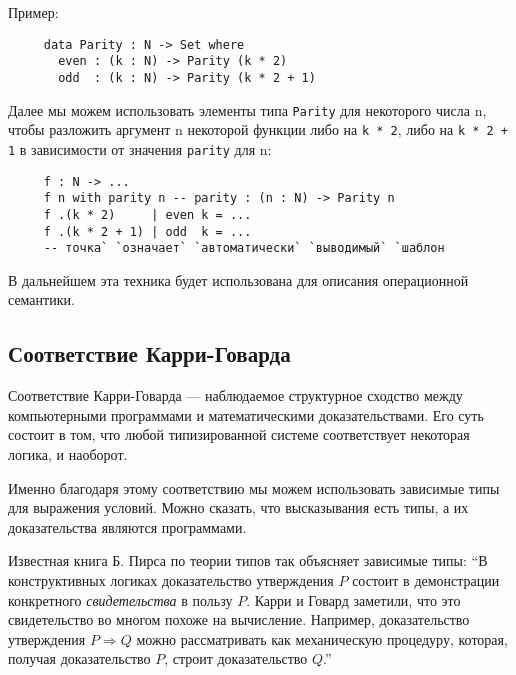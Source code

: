 \documentclass[aps,12pt,final,oneside,onecolumn,musixtex,superscriptaddress,centertags]{article}
\newcommand{\lcode}[1]{\lstinline[basicstyle=\ttfamily\normalsize]{#1}}
\begin{document}
     Пример:
     \begin{lstlisting}
     data Parity : N -> Set where
       even : (k : N) -> Parity (k * 2)
       odd  : (k : N) -> Parity (k * 2 + 1)
     \end{lstlisting}

     Далее мы можем использовать элементы типа \lcode{Parity} для некоторого числа n, чтобы разложить аргумент n некоторой функции либо на \lcode{k * 2}, либо на \lcode{k * 2 + 1} в зависимости от значения \lcode{parity} для n:
     \begin{lstlisting}
     f : N -> ...
     f n with parity n -- parity : (n : N) -> Parity n
     f .(k * 2)     | even k = ...
     f .(k * 2 + 1) | odd  k = ...
     -- точка` `означает` `автоматически` `выводимый` `шаблон
     \end{lstlisting}

     В дальнейшем эта техника будет использована для описания операционной семантики.
     
  \subsection{Соответствие Карри-Говарда}

     Соответствие Карри-Говарда --- наблюдаемое структурное сходство между компьютерными программами и математическими доказательствами. Его суть состоит в том, что любой типизированной системе соответствует некоторая логика, и наоборот.

     Именно благодаря этому соответствию мы можем использовать зависимые типы для выражения условий. Можно сказать, что высказывания есть типы, а их доказательства являются программами.

     Известная книга Б. Пирса по теории типов так объясняет зависимые типы: ``В конструктивных логиках доказательство утверждения $P$ состоит в демонстрации конкретного \emph{свидетельства} в пользу $P$. Карри и Говард заметили, что это свидетельство во многом похоже на вычисление. Например, доказательство утверждения $P \Rightarrow Q$ можно рассматривать как механическую процедуру, которая, получая доказательство $P$, строит доказательство $Q$.''\cite{Pierce:2002:TPL:509043}
\end{document}
